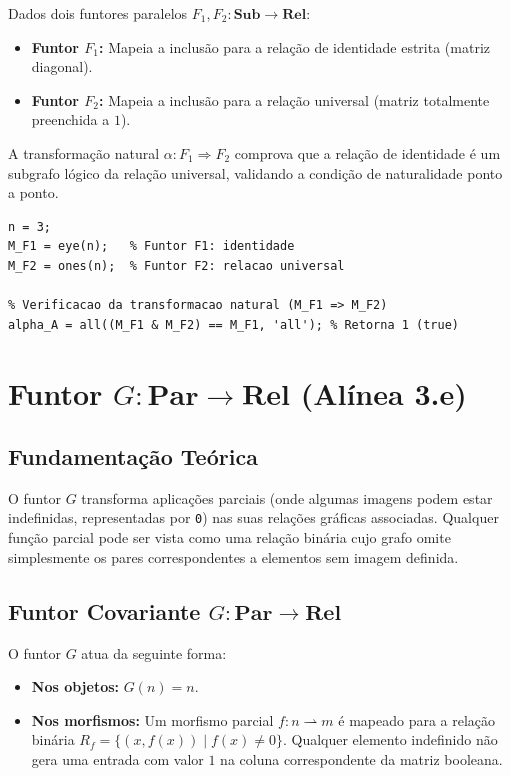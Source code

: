 Dados dois funtores paralelos $F_1, F_2: \mathbf{Sub} \to \mathbf{Rel}$:
\begin{itemize}
    \item \textbf{Funtor $F_1$:} Mapeia a inclusão para a relação de identidade estrita (matriz diagonal).
    \item \textbf{Funtor $F_2$:} Mapeia a inclusão para a relação universal (matriz totalmente preenchida a $1$).
\end{itemize}
A transformação natural $\alpha: F_1 \Rightarrow F_2$ comprova que a relação de identidade é um subgrafo lógico da relação universal, validando a condição de naturalidade ponto a ponto.

\begin{lstlisting}[style=matlab, caption={Transformação natural $\alpha: F_1 \Rightarrow F_2$ em $\mathbf{Sub} \to \mathbf{Rel}$}]
n = 3;
M_F1 = eye(n);   % Funtor F1: identidade
M_F2 = ones(n);  % Funtor F2: relacao universal

% Verificacao da transformacao natural (M_F1 => M_F2)
alpha_A = all((M_F1 & M_F2) == M_F1, 'all'); % Retorna 1 (true)
\end{lstlisting}

\section{Funtor $G: \mathbf{Par} \to \mathbf{Rel}$ (Alínea 3.e)}
\label{sec:functor-par-rel}

\subsection{Fundamentação Teórica}

O funtor $G$ transforma aplicações parciais (onde algumas imagens podem estar indefinidas, representadas por \texttt{0}) nas suas relações gráficas associadas. Qualquer função parcial pode ser vista como uma relação binária cujo grafo omite simplesmente os pares correspondentes a elementos sem imagem definida.

\subsection{Funtor Covariante $G: \mathbf{Par} \to \mathbf{Rel}$}

\begin{definition}
O funtor $G$ atua da seguinte forma:
\begin{itemize}
    \item \textbf{Nos objetos:} $G(n) = n$.
    \item \textbf{Nos morfismos:} Um morfismo parcial $f: n \rightharpoonup m$ é mapeado para a relação binária $R_f = \{(x, f(x)) \mid f(x) \neq 0\}$. Qualquer elemento indefinido não gera uma entrada com valor $1$ na coluna correspondente da matriz booleana.
\end{itemize}
\end{definition}

